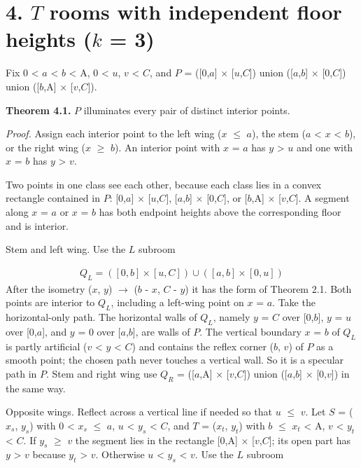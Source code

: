 \documentclass[11pt]{article}
\begin{document}
\section*{4. \(T\) rooms with independent floor heights (\(k\) = 3)}
Fix 0 < \(a\) < \(b\) < A, 0 < \(u\), \(v\) < \(C\), and \(P\) = ([0,\(a\)] \(\times\) [\(u\),\(C\)]) union ([\(a\),\(b\)] \(\times\) [0,\(C\)]) union ([\(b\),A] \(\times\) [\(v\),\(C\)]).

\textbf{Theorem 4.1.} \(P\) illuminates every pair of distinct interior points.

\emph{Proof.} Assign each interior point to the left wing (\(x\) \(\le\) \(a\)), the stem (\(a\) < \(x\) < \(b\)), or the right wing (\(x\) \(\ge\) \(b\)). An interior point with \(x\) = \(a\) has \(y\) > \(u\) and one with \(x\) = \(b\) has \(y\) > \(v\).

Two points in one class see each other, because each class lies in a convex rectangle contained in \(P\): [0,\(a\)] \(\times\) [\(u\),\(C\)], [\(a\),\(b\)] \(\times\) [0,\(C\)], or [\(b\),A] \(\times\) [\(v\),\(C\)]. A segment along \(x\) = \(a\) or \(x\) = \(b\) has both endpoint heights above the corresponding floor and is interior.

Stem and left wing. Use the \(L\) subroom

\begin{gather*}
Q_{L} = ([0,b] \times [u,C]) \cup ([a,b] \times [0,u])
\end{gather*}
After the isometry (\(x\), \(y\)) \(\to\) (\(b\) - \(x\), \(C\) - \(y\)) it has the form of Theorem 2.1. Both points are interior to \(Q_{L}\), including a left-wing point on \(x\) = \(a\). Take the horizontal-only path. The horizontal walls of \(Q_{L}\), namely \(y\) = \(C\) over [0,\(b\)], \(y\) = \(u\) over [0,\(a\)], and \(y\) = 0 over [\(a\),\(b\)], are walls of \(P\). The vertical boundary \(x\) = \(b\) of \(Q_{L}\) is partly artificial (\(v\) < \(y\) < \(C\)) and contains the reflex corner (\(b\), \(v\)) of \(P\) as a smooth point; the chosen path never touches a vertical wall. So it is a specular path in \(P\). Stem and right wing use \(Q_{R}\) = ([\(a\),A] \(\times\) [\(v\),\(C\)]) union ([\(a\),\(b\)] \(\times\) [0,\(v\)]) in the same way.

Opposite wings. Reflect across a vertical line if needed so that \(u\) \(\le\) \(v\). Let \(S\) = (\(x_{s}\), \(y_{s}\)) with 0 < \(x_{s}\) \(\le\) \(a\), \(u\) < \(y_{s}\) < \(C\), and \(T\) = (\(x_{t}\), \(y_{t}\)) with \(b\) \(\le\) \(x_{t}\) < A, \(v\) < \(y_{t}\) < \(C\). If \(y_{s}\) \(\ge\) \(v\) the segment lies in the rectangle [0,A] \(\times\) [\(v\),\(C\)]; its open part has \(y\) > \(v\) because \(y_{t}\) > \(v\). Otherwise \(u\) < \(y_{s}\) < \(v\). Use the \(L\) subroom
\end{document}
